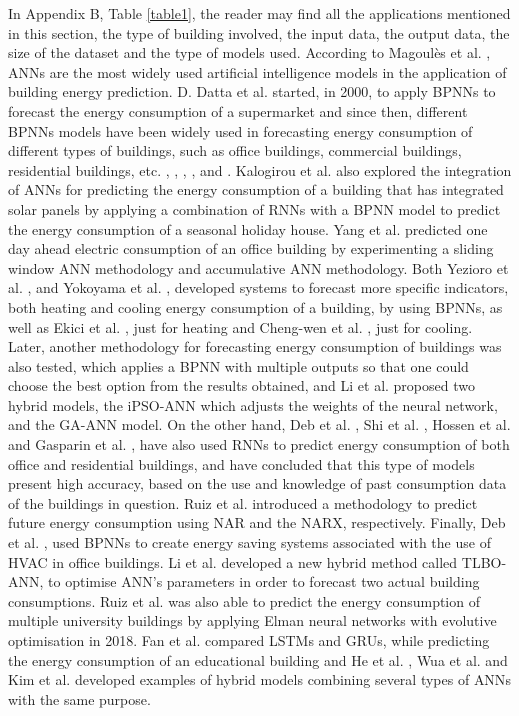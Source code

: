 In Appendix B, Table \ref{table1}, the reader may find all the applications mentioned in this section, the type of building involved, the input data, the output data, the size of the dataset and the type of models used. According to Magoulès et al. \cite{ann1}, \ac{ANNs} are the most widely used artificial intelligence models in the application of building energy prediction. D. Datta et al. \cite{annr1} started, in 2000, to apply \ac{BPNN}s to forecast the energy consumption of a supermarket and since then, different \ac{BPNN}s models have been widely used in forecasting energy consumption of different types of buildings, such as office buildings, commercial buildings, residential buildings, etc. \cite{annr4}, \cite{annr9}, \cite{annr13}, \cite{annr14}, \cite{annr17} and \cite{annr19}. Kalogirou et al. \cite{annr2} also explored the integration of \ac{ANN}s for predicting the energy consumption of a building that has integrated solar panels by applying a combination of \ac{RNN}s with a \ac{BPNN} model to predict the energy consumption of a seasonal holiday house. Yang et al. \cite{annr3} predicted one day ahead electric consumption of an office building by experimenting a sliding window \ac{ANN} methodology and accumulative \ac{ANN} methodology. Both Yezioro et al. \cite{annr5}, and Yokoyama et al. \cite{annr7}, developed systems to forecast more specific indicators, both heating and cooling energy consumption of a building, by using \ac{BPNN}s, as well as Ekici et al. \cite{annr6}, just for heating and Cheng-wen et al. \cite{annr8}, just for cooling. Later, another methodology for forecasting energy consumption of buildings was also tested, which applies a \ac{BPNN} with multiple outputs \cite{annr10} so that one could choose the best option from the results obtained, and Li et al. \cite{annr12} proposed two hybrid models, the \ac{iPSO-ANN} which adjusts the weights of the neural network, and the \ac{GA-ANN} model.
On the other hand, Deb et al. \cite{annr15}, Shi et al. \cite{annr16}, Hossen et al. \cite{annr18} and Gasparin et al. \cite{annr21},  have also used \ac{RNN}s to predict energy consumption of both office and residential buildings, and have concluded that this type of models present high accuracy, based on the use and knowledge of past consumption data of the buildings in question. Ruiz et al. \cite{annr22} introduced a methodology to predict future energy consumption using \ac{NAR} and the \ac{NARX}, respectively.
Finally, Deb et al. \cite{annr20}, used \ac{BPNN}s to create energy saving systems associated with the use of \ac{HVAC} in office buildings.
Li et al. \cite{annr24} developed a new hybrid method called \ac{TLBO-ANN}, to optimise \ac{ANN}’s parameters in order to forecast two actual building consumptions. Ruiz et al. \cite{annr25} was also able to predict the energy consumption of multiple university buildings by applying Elman neural networks with evolutive optimisation in 2018. Fan et al. \cite{annr26} compared \ac{LSTM}s and \ac{GRU}s, while predicting the energy consumption of an educational building and He et al. \cite{annr27}, Wua et al. \cite{annr28} and Kim et al. \cite{annr29} developed examples of hybrid models combining several types of \ac{ANN}s with the same purpose. 



